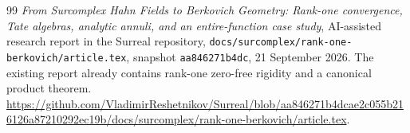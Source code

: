 \documentclass[11pt,letterpaper]{article}
\numberwithin{equation}{section}
\theoremstyle{definition}
\theoremstyle{remark}
\newcommand{\code}[1]{\texttt{#1}}
\begin{document}
\begin{thebibliography}{99}
\emph{From Surcomplex Hahn Fields to Berkovich Geometry:
Rank-one convergence, Tate algebras, analytic annuli, and an entire-function
case study}, AI-assisted research report in the Surreal repository,
\code{docs/surcomplex/rank-one-berkovich/article.tex},
snapshot \code{aa846271b4dc}, 21 September 2026.
The existing report already contains rank-one zero-free rigidity and a
canonical product theorem.
\url{https://github.com/VladimirReshetnikov/Surreal/blob/aa846271b4dcae2c055b216126a87210292ec19b/docs/surcomplex/rank-one-berkovich/article.tex}.

\end{thebibliography}
\endgroup
\end{document}
